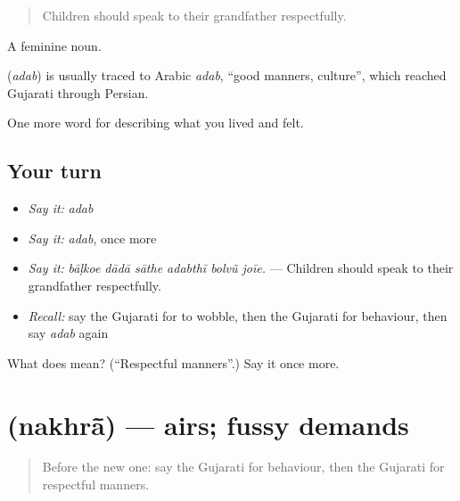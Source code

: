 \begin{quote}
Children should speak to their grandfather respectfully.
\end{quote}

A feminine noun.

\begin{cousinweb}
\textbf{} (\emph{adab}) is usually traced to Arabic \emph{adab}, \textquotedblleft{}good manners, culture\textquotedblright{}, which reached Gujarati through Persian.
\end{cousinweb}

\begin{grammarlens}[title={What you've built}]
One more word for describing what you lived and felt.
\end{grammarlens}

\subsection*{Your turn}
\begin{itemize}
\raggedright
  \item \emph{Say it:} \emph{adab}
  \item \emph{Say it:} \emph{adab}, once more
  \item \emph{Say it:} \emph{bāḷkoe dādā sāthe adabthī bolvũ joīe.} — Children should speak to their grandfather respectfully.
  \item \emph{Recall:} say the Gujarati for to wobble, then the Gujarati for behaviour, then say \emph{adab} again
\end{itemize}

\begin{tcolorbox}[breakable,colback=teal!4,colframe=teal!35!black,title={Before you move on}]
What does  mean? (\textquotedblleft{}Respectful manners\textquotedblright{}.) Say it once more.
\end{tcolorbox}
\section[\texorpdfstring{\gu{નખરાં} (nakhrā̃)}{નખરાં (nakhrā̃)}]{ (nakhrā̃) — airs; fussy demands}

\label{lesson:GU-C467-nakhra}



\begin{quote}
Before the new one: say the Gujarati for behaviour, then the Gujarati for respectful manners.
\end{quote}

